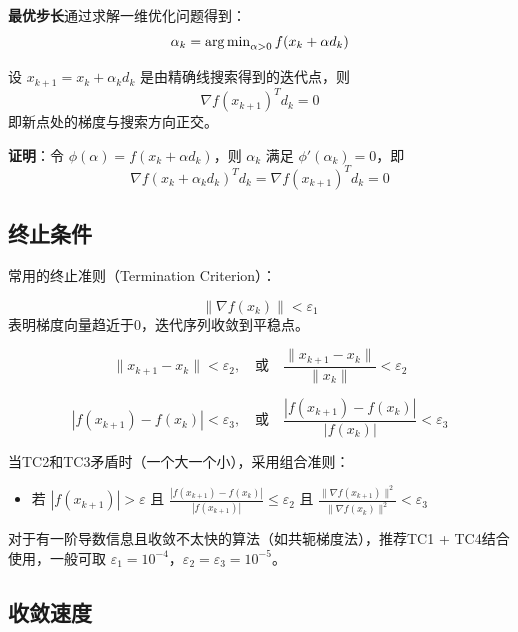 \textbf{最优步长}通过求解一维优化问题得到：
\[
\alpha_k = \operatorname{arg\,min}_{\alpha > 0} f(x_k + \alpha d_k)
\]

\begin{theorem}[最优步长的正交性]
设 $x_{k+1} = x_k + \alpha_k d_k$ 是由精确线搜索得到的迭代点，则
\[
\nabla f(x_{k+1})^T d_k = 0
\]
即新点处的梯度与搜索方向正交。
\end{theorem}

\textbf{证明}：令 $\phi(\alpha) = f(x_k + \alpha d_k)$，则 $\alpha_k$ 满足 $\phi'(\alpha_k) = 0$，即
\[
\nabla f(x_k + \alpha_k d_k)^T d_k = \nabla f(x_{k+1})^T d_k = 0
\]

\subsection{终止条件}

常用的终止准则（Termination Criterion）：

\begin{conceptbox}[TC1：梯度准则]
\[
\|\nabla f(x_k)\| < \varepsilon_1
\]
表明梯度向量趋近于0，迭代序列收敛到平稳点。
\end{conceptbox}

\begin{conceptbox}[TC2：相邻迭代点准则]
\[
\|x_{k+1} - x_k\| < \varepsilon_2,\quad \text{或}\quad \frac{\|x_{k+1} - x_k\|}{\|x_k\|} < \varepsilon_2
\]
\end{conceptbox}

\begin{conceptbox}[TC3：函数值变化准则]
\[
|f(x_{k+1}) - f(x_k)| < \varepsilon_3,\quad \text{或}\quad \frac{|f(x_{k+1}) - f(x_k)|}{|f(x_k)|} < \varepsilon_3
\]
\end{conceptbox}

\begin{notebox}[Himmeblau终止准则（TC4）]
当TC2和TC3矛盾时（一个大一个小），采用组合准则：
\begin{itemize}
    \item 若 $|f(x_{k+1})| > \varepsilon$ 且 $\frac{|f(x_{k+1}) - f(x_k)|}{|f(x_{k+1})|} \leq \varepsilon_2$ 且 $\frac{\|\nabla f(x_{k+1})\|^2}{\|\nabla f(x_k)\|^2} < \varepsilon_3$
\end{itemize}

对于有一阶导数信息且收敛不太快的算法（如共轭梯度法），推荐TC1 + TC4结合使用，一般可取 $\varepsilon_1 = 10^{-4}$，$\varepsilon_2 = \varepsilon_3 = 10^{-5}$。
\end{notebox}

\subsection{收敛速度}

